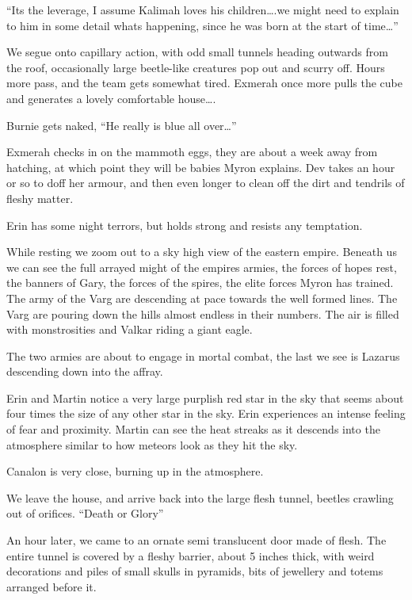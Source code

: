 “Its the leverage, I assume Kalimah loves his children….we might need to explain to him in some detail whats happening, since he was born at the start of time…”\medskip

We segue onto capillary action, with odd small tunnels heading outwards from the roof, occasionally large beetle-like creatures pop out and scurry off. Hours more pass, and the team gets somewhat tired. Exmerah once more pulls the cube and generates a lovely comfortable house….\medskip

Burnie gets naked, “He really is blue all over…”\medskip

Exmerah checks in on the mammoth eggs, they are about a week away from hatching, at which point they will be babies Myron explains. Dev takes an hour or so to doff her armour, and then even longer to clean off the dirt and tendrils of fleshy matter.\medskip

Erin has some night terrors, but holds strong and resists any temptation.\medskip

While resting we zoom out to a sky high view of the eastern empire. Beneath us we can see the full arrayed might of the empires armies, the forces of hopes rest, the banners of Gary, the forces of the spires, the elite forces Myron has trained. The army of the Varg are descending at pace towards the well formed lines. The Varg are pouring down the hills almost endless in their numbers. The air is filled with monstrosities and Valkar riding a giant eagle.\medskip

The two armies are about to engage in mortal combat, the last we see is Lazarus descending down into the affray.\medskip

Erin and Martin notice a very large purplish red star in the sky that seems about four times the size of any other star in the sky. Erin experiences an intense feeling of fear and proximity. Martin can see the heat streaks as it descends into the atmosphere similar to how meteors look as they hit the sky.\medskip

Canalon is very close, burning up in the atmosphere.\medskip

We leave the house, and arrive back into the large flesh tunnel, beetles crawling out of orifices. “Death or Glory”\medskip

An hour later, we came to an ornate semi translucent door made of flesh. The entire tunnel is covered by a fleshy barrier, about 5 inches thick, with weird decorations and piles of small skulls in pyramids, bits of jewellery and totems arranged before it.\medskip


